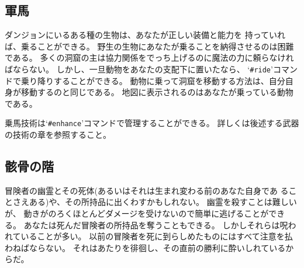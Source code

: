 \subsection*{軍馬}

ダンジョンにいるある種の生物は、あなたが正しい装備と能力を
持っていれば、乗ることができる。
野生の生物にあなたが乗ることを納得させるのは困難である。
多くの洞窟の主は協力関係をでっち上げるのに魔法の力に頼らなければならない。
しかし、一旦動物をあなたの支配下に置いたなら、
`{\tt \#ride}'コマンドで乗り降りすることができる。
動物に乗って洞窟を移動する方法は、自分自身が移動するのと同じである。
地図に表示されるのはあなたが乗っている動物である。

乗馬技術は`{\tt \#enhance}'コマンドで管理することができる。
詳しくは後述する武器の技術の章を参照すること。

\subsection*{骸骨の階}

冒険者の幽霊とその死体(あるいはそれは生まれ変わる前のあなた自身であ
ることさえある)や、その所持品に出くわすかもしれない。
幽霊を殺すことは難しいが、
動きがのろくほとんどダメージを受けないので簡単に逃げることができる。
あなたは死んだ冒険者の所持品を奪うこともできる。
しかしそれらは呪われていることが多い。
以前の冒険者を死に到らしめたものにはすべて注意を払わねばならない。
それはあたりを徘徊し、その直前の勝利に酔いしれているからだ。


